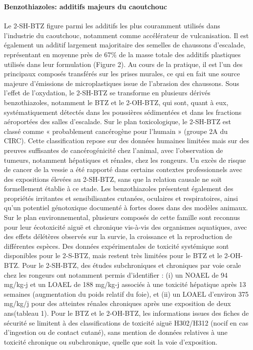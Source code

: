 \documentclass[pdflatex,sn-basic]{sn-jnl}%
\begin{document}
\textbf{Benzothiazoles: additifs majeurs du caoutchouc}
\\ \\
Le 2-SH-BTZ figure parmi les additifs les plus couramment utilisés dans l'industrie du caoutchouc, notamment comme accélérateur de vulcanisation. Il est également un additif largement majoritaire des semelles de chaussons d'escalade, représentant en moyenne près de
67\% de la masse totale des additifs plastiques utilisés dans leur formulation (Figure 2). Au cours de la pratique, il est l'un des principaux composés transférés sur les prises murales, ce qui en fait une source majeure d'émissions de microplastiques issue de l'abrasion des chaussons. Sous l'effet de l'oxydation, le 2-SH-BTZ se transforme en plusieurs dérivés benzothiazoles, notamment le BTZ et le 2-OH-BTZ, qui sont, quant à eux, systématiquement détectés dans les poussières sédimentées et dans les fractions aéroportées des salles d'escalade.
Sur le plan toxicologique, le 2-SH-BTZ est classé comme « probablement cancérogène pour l'humain » (groupe 2A du CIRC). Cette classification repose sur des données humaines limitées mais sur des preuves suffisantes de cancérogénicité chez l'animal, avec l'observation de
tumeurs, notamment hépatiques et rénales, chez les rongeurs. Un excès de risque de cancer de la vessie a été rapporté dans certains contextes professionnels avec des expositions élevées au 2-SH-BTZ, sans que la relation causale ne soit formellement établie à ce stade. Les benzothiazoles présentent également des propriétés irritantes et sensibilisantes cutanées, oculaires et respiratoires, ainsi qu'un potentiel génotoxique documenté à fortes doses dans des modèles animaux. Sur le plan environnemental, plusieurs composés de cette famille sont reconnus pour leur écotoxicité aiguë et chronique vis-à-vis des organismes aquatiques, avec des effets délétères observés sur la survie, la croissance et la reproduction de différentes espèces.
Des données expérimentales de toxicité systémique sont disponibles pour le 2-S-BTZ, mais restent très limitées pour le BTZ et le 2-OH-BTZ. Pour le 2-SH-BTZ, des études subchroniques et chroniques par voie orale chez les rongeurs ont notamment permis d'identifier : (i) un NOAEL de 94 mg/kg‑j et un LOAEL de 188 mg/kg‑j associés à une toxicité hépatique après 13 semaines (augmentation du poids relatif du foie), et (ii) un LOAEL d'environ 375 mg/kg/j pour des atteintes rénales chroniques après une exposition de deux ans(tableau 1). Pour le BTZ et le 2-OH-BTZ, les informations issues des fiches de sécurité se limitent à des classifications de toxicité aiguë H302/H312 (nocif en cas d'ingestion ou de contact cutané), sans mention de données relatives à une toxicité chronique ou subchronique, quelle que soit la voie d'exposition.
\end{document}
